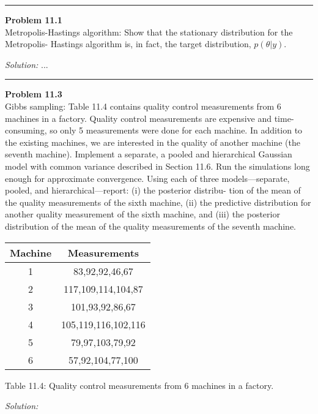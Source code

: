 \documentclass[a4paper, 11pt]{article}
\newenvironment{problem}[2][Problem]
    { \begin{mdframed}[backgroundcolor=gray!20] \textbf{#1 #2} \\}
    {  \end{mdframed}}
\newenvironment{solution}
    {\textit{Solution:}}
    {}
\begin{document}
\noindent\rule{7in}{2.8pt}


\begin{problem}{11.1}
  Metropolis-Hastings algorithm: 
  Show that the stationary distribution for the Metropolis- Hastings algorithm is, in fact, the target distribution, $p(\theta|y)$.
\end{problem}
\begin{solution}
...
\end{solution}

\noindent\rule{7in}{2.8pt}


\begin{problem}{11.3}
  Gibbs sampling: Table 11.4 contains quality control measurements from 6 machines in a factory. 
  Quality control measurements are expensive and time-consuming, so only 5 measurements were done for each machine. 
  In addition to the existing machines, we are interested in the quality of another machine (the seventh machine). 
  Implement a separate, a pooled and hierarchical Gaussian model with common variance described in Section 11.6. 
  Run the simulations long enough for approximate convergence. Using each of three models—separate, pooled, 
  and hierarchical—report: 
  (i) the posterior distribu- tion of the mean of the quality measurements of the sixth machine, 
  (ii) the predictive distribution for another quality measurement of the sixth machine, and 
  (iii) the posterior distribution of the mean of the quality measurements of the seventh machine.

  \begin{tabular}{cc} 
    Machine & Measurements \\
    \hline 1 & 83,92,92,46,67 \\
    2 & 117,109,114,104,87 \\
    3 & 101,93,92,86,67 \\
    4 & 105,119,116,102,116 \\
    5 & 79,97,103,79,92 \\
    6 & 57,92,104,77,100
    \end{tabular} 
    
  Table 11.4: Quality control measurements from 6 machines in a factory.
\end{problem}
\begin{solution}

\end{solution}
\end{document}
